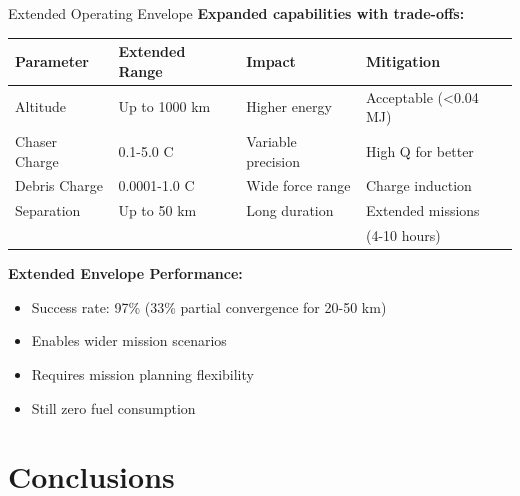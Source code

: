 \documentclass[aspectratio=169]{beamer}
\begin{document}
\begin{frame}{Extended Operating Envelope}
\textbf{Expanded capabilities with trade-offs:}

\vspace{0.5em}
\begin{table}
\footnotesize
\begin{tabular}{llll}
\toprule
\textbf{Parameter} & \textbf{Extended Range} & \textbf{Impact} & \textbf{Mitigation} \\
\midrule
Altitude & Up to 1000 km & Higher energy & Acceptable (<0.04 MJ) \\
Chaser Charge & 0.1-5.0 C & Variable precision & High Q for better \\
Debris Charge & 0.0001-1.0 C & Wide force range & Charge induction \\
Separation & Up to 50 km & Long duration & Extended missions \\
& & & (4-10 hours) \\
\bottomrule
\end{tabular}
\end{table}

\vspace{1em}
\textbf{Extended Envelope Performance:}
\begin{itemize}
    \item Success rate: 97\% (33\% partial convergence for 20-50 km)
    \item Enables wider mission scenarios
    \item Requires mission planning flexibility
    \item Still zero fuel consumption
\end{itemize}
\end{frame}

\section{Conclusions}
\end{document}
